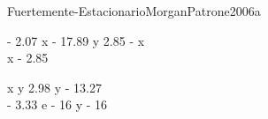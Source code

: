 
\begin{bilevelmodel}{Fuertemente-Estacionario}{MorganPatrone2006a}
    \begin{upperlevel}{- 2.07 x - 17.89 y}{
         2.85 - x  \\ 
 x - 2.85 
    }
    \end{upperlevel}
    \begin{lowerlevel}{x y}{
         2.98 y - 13.27  \\ 
 - 3.33 e - 16 y - 16 
    }
    \end{lowerlevel}
\end{bilevelmodel}
    
        
